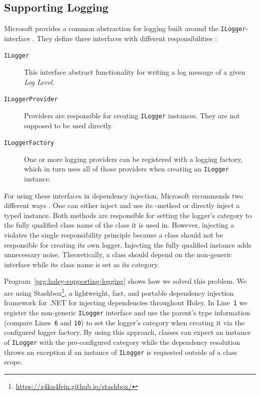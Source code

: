 \subsection{Supporting Logging}
\label{sec:holey-supporting-logging}
Microsoft provides a common abstraction for logging built around the \verb|ILogger|-interface \cite{microsoft_logging_2023}.
They define three interfaces with different responsibilities \cite{bahreini_should_2018}:
%
\begin{description}
    \item[\texttt{ILogger}] This interface abstract functionality for writing a log message of a given \emph{Log Level}.
    \item[\texttt{ILoggerProvider}] Providers are responsible for creating \verb|ILogger| instances. They are not supposed to be used directly.
    \item[\texttt{ILoggerFactory}] One or more logging providers can be registered with a logging factory, which in turn uses all of those providers when creating an \verb|ILogger| instance.
\end{description}

For using these interfaces in dependency injection, Microsoft recommends two different ways \cite{microsoft_logging_2023}.
One can either inject \texttt{} and use its \texttt{}-method or directly inject a typed \texttt{} instance.
Both methods are responsible for setting the logger's category to the fully qualified class name of the class it is used in.
However, injecting a \texttt{} violates the single responsibility principle \cite{bahreini_should_2018} because a class should not be responsible for creating its own logger.
Injecting the fully qualified \texttt{} instance adds unnecessary noise.
Theoretically, a class should depend on the non-generic interface \texttt{} while its class name is set as its category.

Program~\ref{prg:holey-supporting-logging} shows how we solved this problem.
We are using Stashbox\footnote{\url{https://z4kn4fein.github.io/stashbox/}}, a lightweight, fast, and portable dependency injection framework for .NET for injecting dependencies throughout Holey.
In Line~\verb|1| we register the non-generic \verb|ILogger| interface and use the parent's type information (compare Lines~\verb|6| and \verb|10|) to set the logger's category when creating it via the configured logger factory.
By using this approach, classes can expect an instance of \verb|ILogger| with the pre-configured category while the dependency resolution throws an exception if an instance of \verb|ILogger| is requested outside of a class scope.

